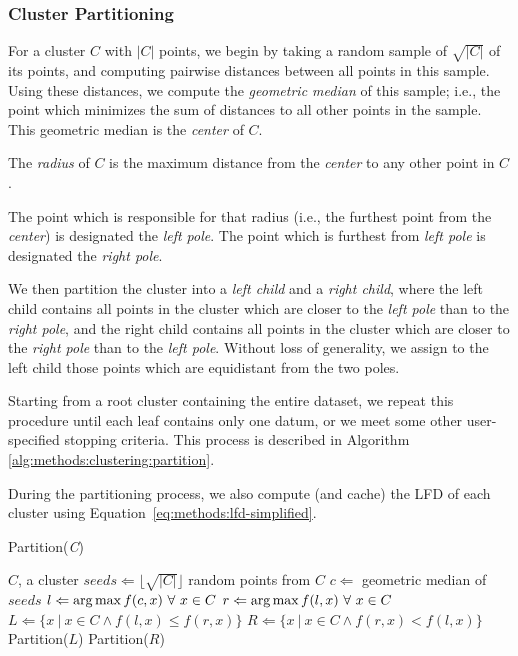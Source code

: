 \subsubsection {Cluster Partitioning}
\label{subsubsec:methods:cluster-partitioning}

For a cluster $C$ with $|C|$ points, we begin by taking a random sample of $\sqrt{|C|}$ of its points, and computing pairwise distances between all points in this sample.
Using these distances, we compute the \emph{geometric median} of this sample; 
i.e., the point which minimizes the sum of distances to all other points in the sample.
This geometric median is the \emph{center} of $C$.

The \emph{radius} of $C$ is the maximum distance from the \emph{center} to any other point in $C$.

The point which is responsible for that radius (i.e., the furthest point from the \emph{center}) is designated the \emph{left pole}.
The point which is furthest from \emph{left pole} is designated the \emph{right pole}.

We then partition the cluster into a \emph{left child} and a \emph{right child}, where the left child contains all points in the cluster which are closer to the \emph{left pole} than to the \emph{right pole}, and the right child contains all points in the cluster which are closer to the \emph{right pole} than to the \emph{left pole}.
Without loss of generality, we assign to the left child those points which are equidistant from the two poles.

Starting from a root cluster containing the entire dataset, we repeat this procedure until each leaf contains only one datum, or we meet some other user-specified stopping criteria.
This process is described in Algorithm \ref{alg:methods:clustering:partition}.

During the partitioning process, we also compute (and cache) the LFD of each cluster using Equation~\ref{eq:methods:lfd-simplified}.

\begin{algorithm} %
    \caption{Partition(\emph{C})} %
    \label{alg:methods:clustering:partition} %
    \begin{algorithmic} %
        \REQUIRE $C$, a cluster
        \STATE $seeds \Leftarrow \lfloor \sqrt{|C|} \rfloor$ random points from $C$
        \STATE $c \Leftarrow$ geometric median of $seeds$
        \STATE $l \Leftarrow \operatorname*{arg\,max} f(c, x) \ \forall \ x \in C$
        \STATE $r \Leftarrow \argmax f(l, x) \ \forall \ x \in C$
        \STATE $L \Leftarrow \{x \ | \ x \in C \land f(l, x) \le f(r, x)\}$
        \STATE $R \Leftarrow \{x \ | \ x \in C \land f(r, x) < f(l, x)\}$
            \STATE Partition($L$)
        \ENDIF
            \STATE Partition($R$)
        \ENDIF
    \end{algorithmic}
\end{algorithm}


